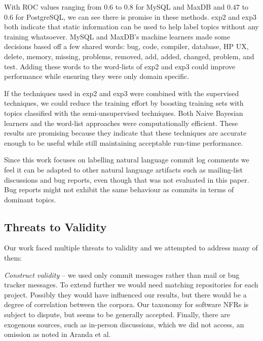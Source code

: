 \documentclass[smallextended]{svjour3}       %
\begin{document}

With ROC values ranging from $0.6$ to $0.8$ for MySQL and MaxDB and
$0.47$ to $0.6$ for PostgreSQL, we can see there is promise in these methods.
\textsf{exp2} and \textsf{exp3} both indicate that static information can be used to help label topics without any training whatsoever. 
MySQL and MaxDB's machine learners made some decisions based off a few shared words: \textsf{bug, code, compiler, database, HP UX, delete, memory,
missing, problems, removed, add, added, changed, problem, and test}. 
Adding these words to the word-lists of \textsf{exp2} and \textsf{exp3} could improve performance while ensuring they were only domain specific.

If the techniques used in \textsf{exp2} and \textsf{exp3} were combined with the supervised techniques, we could reduce the training effort by boosting
training sets with topics classified with the semi-unsupervised techniques.
Both Naive Bayesian learners and the word-list approaches were computationally efficient.  
These results are promising because they indicate that these
techniques are accurate enough to be useful while still maintaining
acceptable run-time performance.

Since this work focuses on labelling natural language commit log
comments we feel it can be adapted to other natural language artifacts
such as mailing-list discussions and bug reports, even though that was
not evaluated in this paper. Bug reports might not exhibit the same
behaviour as commits in terms of dominant topics.

\subsection{Threats to Validity}

Our work faced multiple threats to validity and we attempted to address many of them:

\emph{Construct validity} -- we used only commit messages rather than
mail or bug tracker messages. 
To extend further we would need matching repositories for each project.
Possibly they would have influenced our results, but there would be a degree of correlation between the corpora.
Our taxonomy for software NFRs is subject to dispute, but seems to be
generally accepted. Finally, there are exogenous sources, such as
in-person discussions, which we did not access, an omission as noted
in Aranda et al.~\cite{aranda09icse} %
\end{document}

